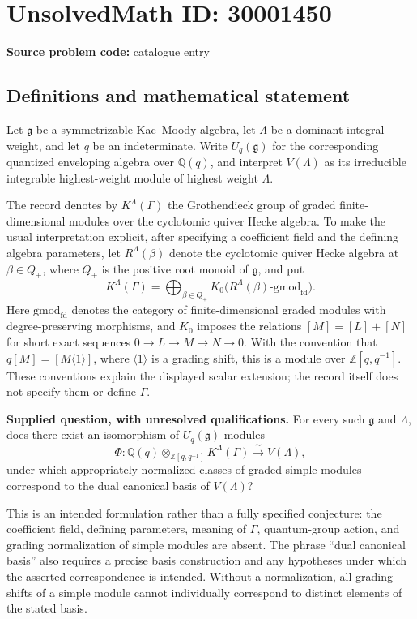 \documentclass[11pt]{article}
\newcommand{\Z}{\mathbb{Z}}
\newcommand{\Q}{\mathbb{Q}}
\begin{document}
\section*{UnsolvedMath ID: 30001450}
\textbf{Source problem code:} catalogue entry
\subsection{Definitions and mathematical statement}
Let \(\mathfrak g\) be a symmetrizable Kac--Moody algebra, let \(\Lambda\) be a dominant integral weight, and let \(q\) be an indeterminate. Write \(U_q(\mathfrak g)\) for the corresponding quantized enveloping algebra over \(\Q(q)\), and interpret \(V(\Lambda)\) as its irreducible integrable highest-weight module of highest weight \(\Lambda\).

The record denotes by \(K^\Lambda(\Gamma)\) the Grothendieck group of graded finite-dimensional modules over the cyclotomic quiver Hecke algebra. To make the usual interpretation explicit, after specifying a coefficient field and the defining algebra parameters, let \(R^\Lambda(\beta)\) denote the cyclotomic quiver Hecke algebra at \(\beta\in Q_+\), where \(Q_+\) is the positive root monoid of \(\mathfrak g\), and put
\[
K^\Lambda(\Gamma)=\bigoplus_{\beta\in Q_+}K_0\bigl(R^\Lambda(\beta)\text{-}\mathrm{gmod}_{\mathrm{fd}}\bigr).
\]
Here \(\mathrm{gmod}_{\mathrm{fd}}\) denotes the category of finite-dimensional graded modules with degree-preserving morphisms, and \(K_0\) imposes the relations \([M]=[L]+[N]\) for short exact sequences \(0\to L\to M\to N\to0\). With the convention that \(q[M]=[M\langle1\rangle]\), where \(\langle1\rangle\) is a grading shift, this is a module over \(\Z[q,q^{-1}]\). These conventions explain the displayed scalar extension; the record itself does not specify them or define \(\Gamma\).

\textbf{Supplied question, with unresolved qualifications.} For every such \(\mathfrak g\) and \(\Lambda\), does there exist an isomorphism of \(U_q(\mathfrak g)\)-modules
\[
\Phi:\Q(q)\otimes_{\Z[q,q^{-1}]}K^\Lambda(\Gamma)\xrightarrow{\ \sim\ }V(\Lambda),
\]
under which appropriately normalized classes of graded simple modules correspond to the dual canonical basis of \(V(\Lambda)\)?

This is an intended formulation rather than a fully specified conjecture: the coefficient field, defining parameters, meaning of \(\Gamma\), quantum-group action, and grading normalization of simple modules are absent. The phrase ``dual canonical basis'' also requires a precise basis construction and any hypotheses under which the asserted correspondence is intended. Without a normalization, all grading shifts of a simple module cannot individually correspond to distinct elements of the stated basis.
\end{document}
